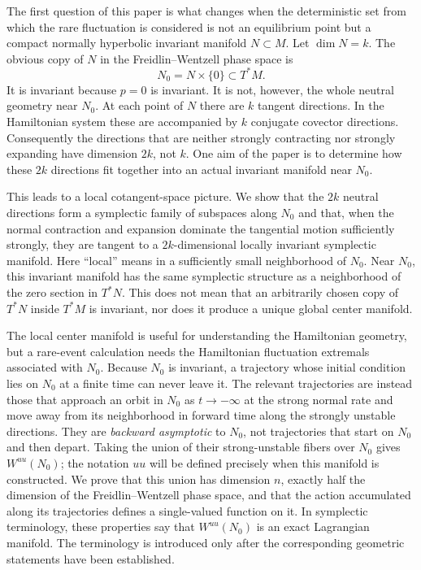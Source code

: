 \documentclass[11pt]{article}
\theoremstyle{definition}
\theoremstyle{remark}
\begin{document}
The first question of this paper is what changes when the deterministic set from which the rare fluctuation is considered is not an equilibrium point but a compact normally hyperbolic invariant manifold $N\subset M$.  Let $\dim N=k$.  The obvious copy of $N$ in the Freidlin--Wentzell phase space is
\begin{equation}
N_0=N\times\{0\}\subset T^*M.
\label{eq:N0-intro}
\end{equation}
It is invariant because $p=0$ is invariant.  It is not, however, the whole neutral geometry near $N_0$.  At each point of $N$ there are $k$ tangent directions.  In the Hamiltonian system these are accompanied by $k$ conjugate covector directions.  Consequently the directions that are neither strongly contracting nor strongly expanding have dimension $2k$, not $k$.  One aim of the paper is to determine how these $2k$ directions fit together into an actual invariant manifold near $N_0$.

This leads to a local cotangent-space picture.  We show that the $2k$ neutral directions form a symplectic family of subspaces along $N_0$ and that, when the normal contraction and expansion dominate the tangential motion sufficiently strongly, they are tangent to a $2k$-dimensional locally invariant symplectic manifold.  Here ``local'' means in a sufficiently small neighborhood of $N_0$.  Near $N_0$, this invariant manifold has the same symplectic structure as a neighborhood of the zero section in $T^*N$.  This does not mean that an arbitrarily chosen copy of $T^*N$ inside $T^*M$ is invariant, nor does it produce a unique global center manifold.

The local center manifold is useful for understanding the Hamiltonian geometry, but a rare-event calculation needs the Hamiltonian fluctuation extremals associated with $N_0$.  Because $N_0$ is invariant, a trajectory whose initial condition lies on $N_0$ at a finite time can never leave it.  The relevant trajectories are instead those that approach an orbit in $N_0$ as $t\to-\infty$ at the strong normal rate and move away from its neighborhood in forward time along the strongly unstable directions.  They are \emph{backward asymptotic} to $N_0$, not trajectories that start on $N_0$ and then depart.  Taking the union of their strong-unstable fibers over $N_0$ gives $W^{uu}(N_0)$; the notation $uu$ will be defined precisely when this manifold is constructed.  We prove that this union has dimension $n$, exactly half the dimension of the Freidlin--Wentzell phase space, and that the action accumulated along its trajectories defines a single-valued function on it.  In symplectic terminology, these properties say that $W^{uu}(N_0)$ is an exact Lagrangian manifold.  The terminology is introduced only after the corresponding geometric statements have been established.
\end{document}
